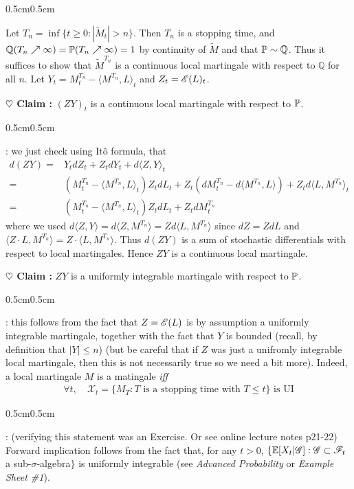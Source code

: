 \documentclass[10pt,a4paper]{article}
\newenvironment{proof}
{\begin{changemargin}{0.5cm}{0.5cm} 
	}%
	{\end{changemargin}
}
\newenvironment{subproof}
{\begin{changemargin}{0.5cm}{0.5cm} 
	}%
	{\end{changemargin}
}
\newenvironment{p}
{\begin{proof} 
	}%
	{\end{proof}
}
\begin{document}
\begin{p}
\pf Let $T_n = \inf \{t\geq 0 : |\tilde{M}_t| >n \}$. Then $T_n$ is a stopping time, and $\mathbb{Q}(T_n \nearrow \infty) = \mathbb{P} (T_n \nearrow \infty)=1$ by continuity of $\tilde{M}$ and that $\mathbb{P} \sim \mathbb{Q}$. Thus it suffices to show that $\tilde{M}^{T_n}$ is a continuous local martingale with respect to $\mathbb{Q}$ for all $n$. Let $Y_t = {M}_t^{T_n} - \langle M^{T_n} , L \rangle_t$ and $Z_t = \mathscr{E}(L)_t$.

\textbf{$\heartsuit$ Claim :} $(Z Y)_t$ is a continuous local martingale with respect to $\mathbb{P}$. 
\begin{subproof}
: we just check using It\^o formula, that
\begin{align*}
d(ZY) =& Y_t dZ_t + Z_t dY_t + d\langle Z, Y \rangle_t \\
=& (M_t^{T_n} - \langle M^{T_n}, L \rangle_t )Z_t dL_t + Z_t (dM_t^{T_n} - d\langle M^{T_n}, L \rangle) + Z_t d\langle L, M^{T_n} \rangle_t \\
= & (M_t^{T_n} - \langle M^{T_n}, L \rangle_t )Z_t dL_t + Z_t dM_t^{T_n}
\end{align*}
where we used $d \langle Z, Y \rangle = d\langle Z, M^{T_n} \rangle = Zd\langle L, M^{T_n} \rangle$ since $dZ= ZdL$ and $\langle Z\cdot L, M^{T_n} \rangle = Z\cdot \langle L, M^{T_n} \rangle$. Thus $d(ZY)$ is a sum of stochastic differentials with respect to local martingales. Hence $ZY$ is a continuous local martingale.
\end{subproof}

\textbf{$\heartsuit$ Claim :} $ZY$ is a uniformly integrable martingale with respect to $\mathbb{P}$.
\begin{subproof}
: this follows from the fact that $Z= \mathscr{E}(L)$ is by assumption a uniformly integrable martingale, together with the fact that $Y$ is bounded (recall, by definition that $|Y|\leq n$) (but be careful that if $Z$ was just a unifromly integrable local martingale, then this is not necessarily true so we need a bit more). Indeed, a local martingale $M$ is a matingale \emph{iff}
\begin{align*}
\forall t, \quad \mathscr{X}_t = \{ M_T : T\text{ is a stopping time with } T\leq t \} \text{ is UI}
\end{align*}
\begin{subproof}
: (verifying  this statement was an Exercise. Or see online lecture notes p21-22) Forward implication follows from the fact that, for any $t>0$, $\{ \mathbb{E}[X_t | \mathscr{G}] : \mathscr{G} \subset \mathscr{F}_t$ a sub-$\sigma$-algebra$\}$ is uniformly integrable (see \emph{Advanced Probability} or \emph{Example Sheet \#1}).


\end{subproof}
\end{subproof}
\end{p}
\end{document}
